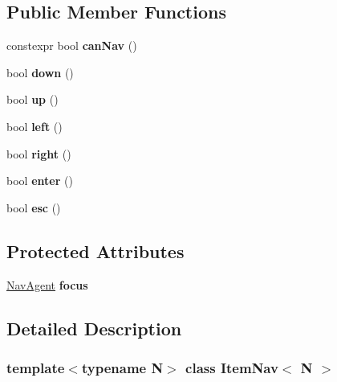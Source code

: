 \subsection*{Public Member Functions}
\begin{DoxyCompactItemize}
\item 
\mbox{\label{classItemNav_a3934991e48ba1b1abf8c873e6bf7af25}} 
constexpr bool {\bfseries can\+Nav} ()
\item 
\mbox{\label{classItemNav_a7b1e23be5b65747a3b784ceb320c00a0}} 
bool {\bfseries down} ()
\item 
\mbox{\label{classItemNav_a08897c6a4179532feb4d5dd5b6435d36}} 
bool {\bfseries up} ()
\item 
\mbox{\label{classItemNav_a6b57c512b1edcc9200fe2772d07ad3c0}} 
bool {\bfseries left} ()
\item 
\mbox{\label{classItemNav_ad8755c335b7bbd74d40a24701165fc81}} 
bool {\bfseries right} ()
\item 
\mbox{\label{classItemNav_a4c7c8c1f36c7fe14ef49f4b1fee8fd82}} 
bool {\bfseries enter} ()
\item 
\mbox{\label{classItemNav_a655847b2222d9b2f62f7db22938551db}} 
bool {\bfseries esc} ()
\end{DoxyCompactItemize}
\subsection*{Protected Attributes}
\begin{DoxyCompactItemize}
\item 
\mbox{\label{classItemNav_a6b58882d926efce27e342fac54fe853a}} 
\hyperlink{structNavAgent}{Nav\+Agent} {\bfseries focus}
\end{DoxyCompactItemize}


\subsection{Detailed Description}
\subsubsection*{template$<$typename N$>$\newline
class Item\+Nav$<$ N $>$}

